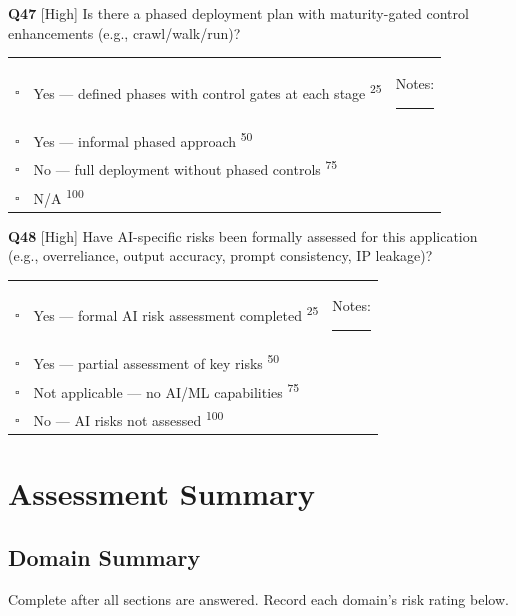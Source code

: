 \documentclass[11pt,landscape]{article}
\begin{document}
\vspace{0.3cm}

\noindent\colorbox{highbg}{\textbf{Q47} [High]} Is there a phased deployment plan with maturity-gated control enhancements (e.g., crawl/walk/run)?

\begin{tabularx}{\textwidth}{cXX}
$\square$ & Yes --- defined phases with control gates at each stage \textsuperscript{\scriptsize\textcolor{stridegray}{25}} & Notes: \rule{4cm}{0.4pt} \\
$\square$ & Yes --- informal phased approach \textsuperscript{\scriptsize\textcolor{stridegray}{50}} &  \\
$\square$ & No --- full deployment without phased controls \textsuperscript{\scriptsize\textcolor{stridegray}{75}} &  \\
$\square$ & N/A \textsuperscript{\scriptsize\textcolor{stridegray}{100}} &  \\
\end{tabularx}

\vspace{0.3cm}

\noindent\colorbox{highbg}{\textbf{Q48} [High]} Have AI-specific risks been formally assessed for this application (e.g., overreliance, output accuracy, prompt consistency, IP leakage)?

\begin{tabularx}{\textwidth}{cXX}
$\square$ & Yes --- formal AI risk assessment completed \textsuperscript{\scriptsize\textcolor{stridegray}{25}} & Notes: \rule{4cm}{0.4pt} \\
$\square$ & Yes --- partial assessment of key risks \textsuperscript{\scriptsize\textcolor{stridegray}{50}} &  \\
$\square$ & Not applicable --- no AI/ML capabilities \textsuperscript{\scriptsize\textcolor{stridegray}{75}} &  \\
$\square$ & No --- AI risks not assessed \textsuperscript{\scriptsize\textcolor{stridegray}{100}} &  \\
\end{tabularx}

\vspace{0.3cm}

\newpage


\section{Assessment Summary}

\subsection{Domain Summary}
Complete after all sections are answered. Record each domain's risk rating below.
\end{document}
